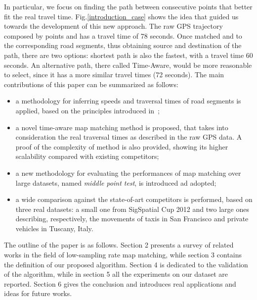\documentclass[5p]{elsarticle}
\begin{document}
In particular, we focus on finding the path between consecutive points that better fit 
the real travel time. 
Fig.\ref{introduction_case}
shows the idea that guided us towards the development of this new approach. The raw GPS trajectory composed by points  and  has a travel time of 78 seconds. Once
matched  and  to the corresponding road segments, thus obtaining source and destination of the path, there are two options: shortest path is also the fastest, with a travel time  60 
seconds. An alternative path, there called Time-Aware, would be more reasonable to select, since it has a more similar travel times (72 seconds). 
The main contributions of this paper can be summarized as follows:
\begin{itemize}
\item a methodology for inferring speeds and traversal times of road segments is applied, based on the principles introduced in~\cite{cintia2013gravity};
\item a novel time-aware map matching method is proposed, that takes into consideration the real traversal times as described in the raw GPS data. A proof of the complexity of method is also provided, showing its higher scalability compared with existing competitors;
\item a new methodology for evaluating the performances of map matching over large datasets, named {\em middle point test}, is introduced ad adopted;
\item a wide comparison against the state-of-art competitors is performed, based on three real datasets: a small one from SigSpatial Cup 2012 and two large ones describing, respectively, the movements of taxis in San Francisco and private vehicles in Tuscany, Italy.
\end{itemize}

The outline of the paper is as follows. Section 2 presents a survey of related works in the field of low-sampling rate map matching, while section 3 contains the definition
of our proposed algorithm. Section 4 is dedicated to the validation of the algorithm, while in section 5 all the experiments on our dataset are reported. Section 6 gives the conclusion and introduces real applications and ideas for future works. 
\end{document}
